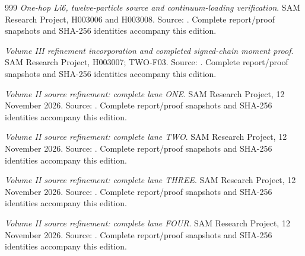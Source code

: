 \begin{thebibliography}{999}
\emph{One-hop Li6, twelve-particle source and continuum-loading verification}. SAM Research Project, H003006 and H003008. Source: . Complete report/proof snapshots and SHA-256 identities accompany this edition.

\emph{Volume III refinement incorporation and completed signed-chain moment proof}. SAM Research Project, H003007; TWO-F03. Source: . Complete report/proof snapshots and SHA-256 identities accompany this edition.

\emph{Volume II source refinement: complete lane ONE}. SAM Research Project, 12 November 2026. Source: . Complete report/proof snapshots and SHA-256 identities accompany this edition.

\emph{Volume II source refinement: complete lane TWO}. SAM Research Project, 12 November 2026. Source: . Complete report/proof snapshots and SHA-256 identities accompany this edition.

\emph{Volume II source refinement: complete lane THREE}. SAM Research Project, 12 November 2026. Source: . Complete report/proof snapshots and SHA-256 identities accompany this edition.

\emph{Volume II source refinement: complete lane FOUR}. SAM Research Project, 12 November 2026. Source: . Complete report/proof snapshots and SHA-256 identities accompany this edition.

\end{thebibliography}
